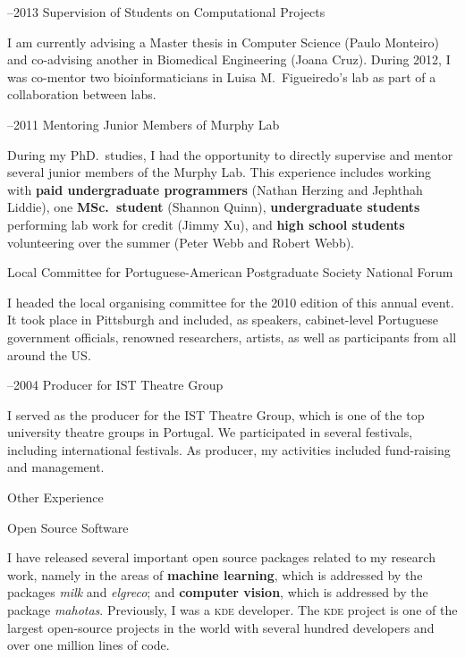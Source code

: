 \documentclass{article}
\renewcommand\section[1]{%
    \par\vspace{2em}\penalty-100%
    {\subhead #1}%
    \par\penalty100\vspace{1em}\penalty100%
}
\newcommand\cvitem[2][\relax]{%
    \par\vspace{.8em}
    \if\relax#1\else{\Date \textcolor{medg}{#1}}\hspace{1em}\fi%
    {\CvItem #2}%
    \par\vspace{.4em}
}
\newcommand\ignore[1]{\relax}
\begin{document}
\cvitem[2012--2013]{Supervision of Students on Computational Projects}
I am currently advising a Master thesis in Computer Science (Paulo Monteiro)
and co-advising another in Biomedical Engineering (Joana Cruz). During 2012, I
was co-mentor two bioinformaticians in Luisa M.\ Figueiredo's lab as part of a
collaboration between labs.

\cvitem[2008--2011]{Mentoring Junior Members of Murphy Lab}
During my PhD.\ studies, I had the opportunity to directly supervise and mentor
several junior members of the Murphy Lab. This experience includes working with
\textbf{paid undergraduate programmers} (Nathan Herzing and Jephthah
Liddie\ignore{---both currently still students at Carnegie Mellon University}),
one \textbf{MSc.\ student} (Shannon Quinn\ignore{, currently a doctoral student
in the Joint Carnegie Mellon University--University of Pittsburgh PhD.\ Program
in Computational Biology}), \textbf{undergraduate students} performing lab work
for credit (Jimmy Xu), and \textbf{high school students} volunteering over the
summer (Peter Webb and Robert Webb).

\cvitem[2010]{Local Committee for Portuguese-American Postgraduate Society National Forum}
I headed the local organising committee for the 2010 edition of this annual
event. It took place in Pittsburgh and included, as speakers, cabinet-level
Portuguese government officials, renowned researchers, artists, as well as
participants from all around the US.

\cvitem[2002--2004]{Producer for IST Theatre Group}
I served as the producer for the IST Theatre Group, which is one of the top
university theatre groups in Portugal. We participated in several festivals,
including international festivals. As producer, my activities included
fund-raising and management.

\section{Other Experience}

\cvitem{Open Source Software}
I have released several important open source packages related to my research
work, namely in the areas of \textbf{machine learning}, which is addressed by
the packages \textit{milk} and \textit{elgreco}; and \textbf{computer vision},
which is addressed by the package \textit{mahotas}. Previously, I was a
\textsc{kde} developer. The \textsc{kde} project is one of the largest
open-source projects in the world with several hundred developers and over one
million lines of code.
\end{document}
